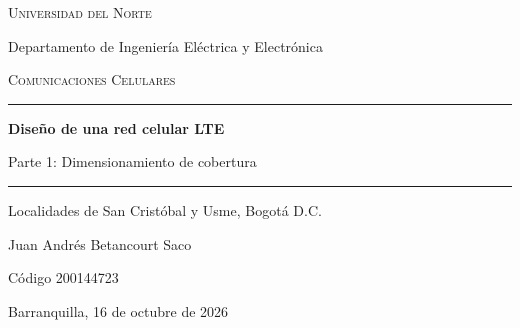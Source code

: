 \documentclass[11pt,letterpaper]{article}
\begin{document}
\begin{titlepage}
\centering
\vspace*{1.2cm}
{\large\scshape Universidad del Norte\par}
{\normalsize Departamento de Ingeniería Eléctrica y Electrónica\par}
\vspace{2.2cm}
{\normalsize\scshape Comunicaciones Celulares\par}
\vspace{0.6cm}
\rule{\textwidth}{0.8pt}\par\vspace{0.4cm}
{\LARGE\bfseries Diseño de una red celular LTE\par}
\vspace{0.25cm}
{\Large Parte 1: Dimensionamiento de cobertura\par}
\vspace{0.4cm}
\rule{\textwidth}{0.8pt}\par
\vspace{0.8cm}
{\large Localidades de San Cristóbal y Usme, Bogotá D.C.\par}
\vspace{2.6cm}
{\large Juan Andrés Betancourt Saco\par}
{\normalsize Código 200144723\par}
\vfill
{\normalsize Barranquilla, 16 de octubre de 2026\par}
\vspace*{0.8cm}
\end{titlepage}

\thispagestyle{fancy}
\begin{abstract}
\noindent Se dimensiona por cobertura una red LTE FDD de \SI{20}{MHz} en la banda 2 (PCS \SI{1900}{MHz}) del operador Claro para el área urbana de las localidades de San Cristóbal y Usme, que suma \SI{47.68}{km^2} en 12 UPZ. Con la estación típica tipo 3 (antena a \SI{30}{m}, MCS 12) y el modelo de propagación COST-231 Hata, la máxima pérdida de trayecto permitida (MAPL) es de \SI{131.96}{dB} en el enlace descendente y de \SI{128.12}{dB} en el ascendente. Los radios de celda resultantes son \SI{0.693}{km} y \SI{0.561}{km}; el enlace ascendente limita y fija el radio efectivo en \SI{0.561}{km}. Cada eNB de tres sectores cubre \SI{0.613}{km^2}, por lo que se requieren \textbf{78 eNB}. Las estaciones se distribuyen en una malla hexagonal con distancia entre sitios de \SI{842}{m}, que cubre el \SI{97.4}{\percent} del área con el radio de diseño. Se entrega el archivo KML con la ubicación de cada eNB y la huella de sus sectores, y se seleccionan equipos Ericsson y antenas Andrew (CommScope) disponibles en el mercado.
\end{abstract}
\end{document}

